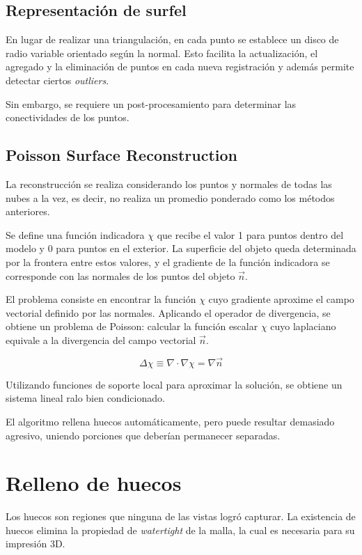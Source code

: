 		\subsection{Representación de surfel}
		En lugar de realizar una triangulación, en cada punto se establece un disco de radio variable orientado según la normal.
		Esto facilita la actualización, el agregado y la eliminación de puntos en cada nueva registración y además permite detectar ciertos \emph{outliers}.\cite{5457479}

		Sin embargo, se requiere un post-procesamiento para determinar las conectividades de los puntos.

		\subsection{Poisson Surface Reconstruction}
		La reconstrucción se realiza considerando los puntos y normales de
		todas las nubes a la vez, es decir, no realiza un promedio ponderado como los métodos anteriores.

		Se define una función indicadora $\chi$ que recibe el valor 1 para puntos
		dentro del modelo y 0 para puntos en el exterior.
		La superficie del objeto queda determinada por la frontera entre estos
		valores, y el gradiente de la función indicadora se corresponde con las
		normales de los puntos del objeto $\vec{n}$.

		El problema consiste en encontrar la función $\chi$ cuyo gradiente
		aproxime el campo vectorial definido por las normales. Aplicando el
		operador de divergencia, se obtiene un problema de Poisson: calcular la
		función escalar $\chi$ cuyo laplaciano equivale a la divergencia del
		campo vectorial $\vec{n}$.

		\[\Delta\chi \equiv \nabla \cdot\nabla\chi = \nabla \vec{n}\]

		Utilizando funciones de soporte local para aproximar la solución, se obtiene un sistema lineal ralo bien condicionado.

		El algoritmo rellena huecos automáticamente, pero puede resultar demasiado agresivo, uniendo porciones que deberían permanecer separadas.\cite{Kazhdan:2006:PSR:1281957.1281965}


	\section{Relleno de huecos}
		Los huecos son regiones que ninguna de las vistas logró capturar.
		La existencia de huecos elimina la propiedad de \emph{watertight} de la
		malla, la cual es necesaria para su impresión 3D.

